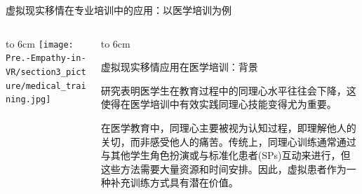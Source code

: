 \documentclass[aspectratio=169,xcolor=dvipsnames]{beamer}
\begin{document}
\begin{frame}{虚拟现实移情在专业培训中的应用：以医学培训为例}
    \begin{columns}[T]
        \begin{column}{0.45\textwidth}
            \vbox to 6cm{
                \vfill
                \centering
                \texttt{[image: Pre.-Empathy-in-VR/section3\_picture/medical\_training.jpg]}
                \vfill
            }
        \end{column}
        
        \begin{column}{0.55\textwidth}
            \vbox to 6cm{
                \vfill
                \begin{block}{虚拟现实移情应用在医学培训：背景}
                
                    研究表明医学生在教育过程中的同理心水平往往会下降，这使得在医学培训中有效实践同理心技能变得尤为重要。
                    
                    在医学教育中，同理心主要被视为认知过程，即理解他人的关切，而非感受他人的痛苦。传统上，同理心训练通常通过与其他学生角色扮演或与标准化患者(SPs)互动来进行，但这些方法需要大量资源和时间安排。因此，虚拟患者作为一种补充训练方式具有潜在价值。
                \end{block}
                \vfill
            }
        \end{column}
    \end{columns}
\end{frame}
\end{document}
